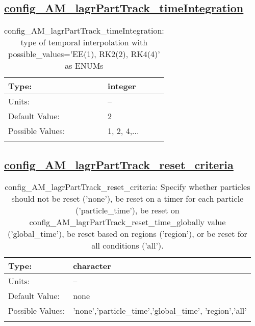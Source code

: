 \subsection[config\_AM\_lagrPartTrack\_timeIntegration]{\hyperref[sec:nm_tab_AM_lagrPartTrack]{config\_AM\_lagrPartTrack\_timeIntegration}}
\label{subsec:nm_sec_config_AM_lagrPartTrack_timeIntegration}
\begin{center}
\begin{longtable}{| p{2.0in} || p{4.0in} |}
    \hline
    Type: & integer \\
    \hline
    Units: & -- \\
    \hline
    Default Value: & 2 \\
    \hline
    Possible Values: & 1, 2, 4,... \\
    \hline
    \caption{config\_AM\_lagrPartTrack\_timeIntegration: type of temporal interpolation with possible\_values='EE(1), RK2(2), RK4(4)' as ENUMs}
\end{longtable}
\end{center}
\subsection[config\_AM\_lagrPartTrack\_reset\_criteria]{\hyperref[sec:nm_tab_AM_lagrPartTrack]{config\_AM\_lagrPartTrack\_reset\_criteria}}
\label{subsec:nm_sec_config_AM_lagrPartTrack_reset_criteria}
\begin{center}
\begin{longtable}{| p{2.0in} || p{4.0in} |}
    \hline
    Type: & character \\
    \hline
    Units: & -- \\
    \hline
    Default Value: & none \\
    \hline
    Possible Values: & 'none','particle\_time','global\_time', 'region','all' \\
    \hline
    \caption{config\_AM\_lagrPartTrack\_reset\_criteria: Specify whether particles should not be reset ('none'), be reset on a timer for each particle ('particle\_time'), be reset on config\_AM\_lagrPartTrack\_reset\_time\_globally value ('global\_time'), be reset based on regions ('region'), or be reset for all conditions ('all').}
\end{longtable}
\end{center}
